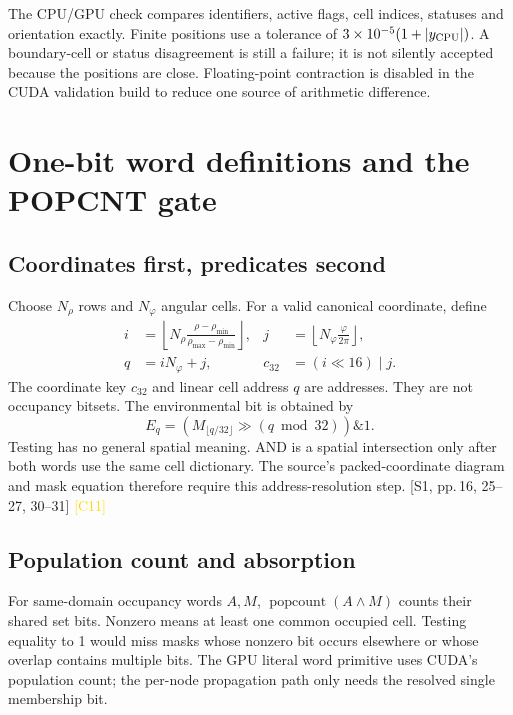 \documentclass[11pt,a4paper]{article}
\newcommand{\src}[2]{\textcolor{muted}{[#1, #2]}}
\newcommand{\corr}[1]{\textcolor{gold}{\textsf{[#1]}}}
\newcommand{\code}[1]{\texttt{\detokenize{#1}}}
\newcommand{\ph}{\varphi}
\newcommand{\pop}{\operatorname{popcount}}
\begin{document}
The CPU/GPU check compares identifiers, active flags, cell indices, statuses and orientation exactly. Finite positions use a tolerance of $3\times10^{-5}(1+|y_{\rm CPU}|)$. A boundary-cell or status disagreement is still a failure; it is not silently accepted because the positions are close. Floating-point contraction is disabled in the CUDA validation build to reduce one source of arithmetic difference.
\clearpage

\section{One-bit word definitions and the POPCNT gate}
\subsection{Coordinates first, predicates second}
Choose $N_\rho$ rows and $N_\ph$ angular cells. For a valid canonical coordinate, define
\begin{align}
 i&=\left\lfloor N_\rho\frac{\rho-\rho_{\min}}{\rho_{\max}-\rho_{\min}}\right\rfloor,
 &j&=\left\lfloor N_\ph\frac{\ph}{2\pi}\right\rfloor,\\
 q&=iN_\ph+j,
 &c_{32}&=(i\ll16)\mathbin{|}j.
\end{align}
The coordinate key $c_{32}$ and linear cell address $q$ are addresses. They are not occupancy bitsets. The environmental bit is obtained by
\begin{equation}
 E_q=\left(M_{\lfloor q/32\rfloor}\gg(q\bmod32)\right)\mathbin{\&}1.
\end{equation}
Testing \code{coordinate_word & environment_word} has no general spatial meaning. AND is a spatial intersection only after both words use the same cell dictionary. The source's packed-coordinate diagram and mask equation therefore require this address-resolution step. \src{S1}{pp.\,16, 25--27, 30--31} \corr{C11}

\subsection{Population count and absorption}
For same-domain occupancy words $A,M$, $\pop(A\land M)$ counts their shared set bits. Nonzero means at least one common occupied cell. Testing equality to 1 would miss masks whose nonzero bit occurs elsewhere or whose overlap contains multiple bits. The GPU literal word primitive uses CUDA's population count; the per-node propagation path only needs the resolved single membership bit.
\end{document}
